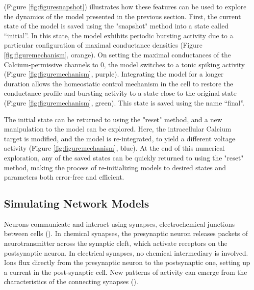 \documentclass{frontiersSCNS} %
\begin{document}
(Figure \ref{fig:figuresnapshot}) illustrates how these features can be used to explore the dynamics of the model presented in the previous section. First, the current state of the model is saved using the "snapshot" method into a state called ``initial''. In this state, the model exhibits periodic bursting activity due to a particular configuration of maximal conductance densities (Figure \ref{fig:figuremechanism}, orange).  On setting the maximal conductances of the Calcium-permissive channels to 0, the model switches to a tonic spiking activity (Figure \ref{fig:figuremechanism}, purple). Integrating the model for a longer duration allows the homeostatic control mechanism in the cell to restore the conductance profile and bursting activity to a state close to the original state (Figure \ref{fig:figuremechanism}, green). This state is saved using the name ``final''.

The initial state can be returned to using the "reset" method, and a new manipulation to the model can be explored. Here, the intracellular Calcium target is modified, and the model is re-integrated, to yield a different voltage activity (Figure \ref{fig:figuremechanism}, blue). At the end of this numerical exploration, any of the saved states can be quickly returned to using the "reset" method, making the process of re-initializing models to desired states and parameters both error-free and efficient.




%
%
%
%
%
%



\subsection{Simulating Network Models}

Neurons communicate and interact using synapses, electrochemical junctions between cells (\cite{gjorgjievaComputationalImplicationsBiophysical2016, huaNeuralActivityDynamics2004}). In chemical synapses, the presynaptic neuron releases packets of neurotransmitter across the synaptic cleft, which activate receptors on the postsynaptic neuron. In electrical synapses, no chemical intermediary is involved. Ions flux directly from the presynaptic neuron to the postsynaptic one, setting up a current in the post-synaptic cell. New patterns of activity can emerge from the characteristics of the connecting synapses (\cite{liComodulationSynapsesVoltagegated2018, nadimSynapticDepressionCreates1999, gutierrezRectifyingElectricalSynapses2013, gutierrezMultipleMechanismsSwitch2013}). 
\end{document}

